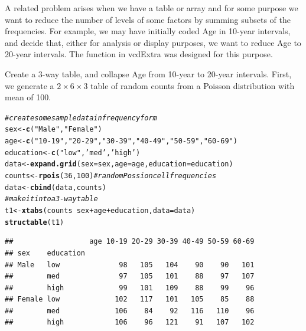 \documentclass[10pt,twoside]{article}\usepackage[]{graphicx}\usepackage[]{color}
\makeatletter
\newcommand{\hlnum}[1]{\textcolor[rgb]{0.686,0.059,0.569}{#1}}%
\newcommand{\hlstr}[1]{\textcolor[rgb]{0.192,0.494,0.8}{#1}}%
\newcommand{\hlcom}[1]{\textcolor[rgb]{0.678,0.584,0.686}{\textit{#1}}}%
\newcommand{\hlopt}[1]{\textcolor[rgb]{0,0,0}{#1}}%
\newcommand{\hlstd}[1]{\textcolor[rgb]{0.345,0.345,0.345}{#1}}%
\newcommand{\hlkwb}[1]{\textcolor[rgb]{0.69,0.353,0.396}{#1}}%
\newcommand{\hlkwc}[1]{\textcolor[rgb]{0.333,0.667,0.333}{#1}}%
\newcommand{\hlkwd}[1]{\textcolor[rgb]{0.737,0.353,0.396}{\textbf{#1}}}%
\newenvironment{kframe}{%
 \def\at@end@of@kframe{}%
 \ifinner\ifhmode%
  \def\at@end@of@kframe{\end{minipage}}%
  \begin{minipage}{\columnwidth}%
 \fi\fi%
 \def\FrameCommand##1{\hskip\@totalleftmargin \hskip-\fboxsep
 \colorbox{shadecolor}{##1}\hskip-\fboxsep
     \hskip-\linewidth \hskip-\@totalleftmargin \hskip\columnwidth}%
 \MakeFramed {\advance\hsize-\width
   \@totalleftmargin\z@ \linewidth\hsize
   \@setminipage}}%
 {\par\unskip\endMakeFramed%
 \at@end@of@kframe}
\newenvironment{knitrout}{}{} %
\newcommand*{\Example}{\fbox{\textbf{\emph{Example}}:} }
\newcommand{\codefun}[1]{\code{#1()}}
\newcommand{\pkg}[1]{{\normalfont\fontseries{b}\selectfont #1}}
\makeatother
\begin{document}
A related problem arises when we have a table or array and for some purpose
we want to reduce the number of levels of some factors by summing subsets
of the frequencies.  For example, we may have initially coded Age in 10-year
intervals, and decide that, either for analysis or display purposes, we
want to reduce Age to 20-year intervals.  The \codefun{collapse.table} function
in \pkg{vcdExtra} was designed for this purpose.

\Example
Create a 3-way table, and collapse Age from 10-year to 20-year intervals. 
First, we generate a $2 \times 6 \times 3$ table of random counts from a 
Poisson distribution with mean of 100.
\begin{knitrout}
\color{fgcolor}\begin{kframe}
\begin{alltt}
\hlcom{# create some sample data in frequency form}
\hlstd{sex} \hlkwb{<-} \hlkwd{c}\hlstd{(}\hlstr{"Male"}\hlstd{,} \hlstr{"Female"}\hlstd{)}
\hlstd{age} \hlkwb{<-} \hlkwd{c}\hlstd{(}\hlstr{"10-19"}\hlstd{,} \hlstr{"20-29"}\hlstd{,}  \hlstr{"30-39"}\hlstd{,} \hlstr{"40-49"}\hlstd{,} \hlstr{"50-59"}\hlstd{,} \hlstr{"60-69"}\hlstd{)}
\hlstd{education} \hlkwb{<-} \hlkwd{c}\hlstd{(}\hlstr{"low"}\hlstd{,} \hlstr{'med'}\hlstd{,} \hlstr{'high'}\hlstd{)}
\hlstd{data} \hlkwb{<-} \hlkwd{expand.grid}\hlstd{(}\hlkwc{sex}\hlstd{=sex,} \hlkwc{age}\hlstd{=age,} \hlkwc{education}\hlstd{=education)}
\hlstd{counts} \hlkwb{<-} \hlkwd{rpois}\hlstd{(}\hlnum{36}\hlstd{,} \hlnum{100}\hlstd{)}   \hlcom{# random Possion cell frequencies}
\hlstd{data} \hlkwb{<-} \hlkwd{cbind}\hlstd{(data, counts)}
\hlcom{# make it into a 3-way table}
\hlstd{t1} \hlkwb{<-} \hlkwd{xtabs}\hlstd{(counts} \hlopt{~} \hlstd{sex} \hlopt{+} \hlstd{age} \hlopt{+} \hlstd{education,} \hlkwc{data}\hlstd{=data)}
\hlkwd{structable}\hlstd{(t1)}
\end{alltt}
\begin{verbatim}
##                  age 10-19 20-29 30-39 40-49 50-59 60-69
## sex    education                                        
## Male   low              98   105   104    90    90   101
##        med              97   105   101    88    97   107
##        high             99   101   109    88    99    96
## Female low             102   117   101   105    85    88
##        med             106    84    92   116   110    96
##        high            106    96   121    91   107   102
\end{verbatim}
\end{kframe}
\end{knitrout}
\end{document}
